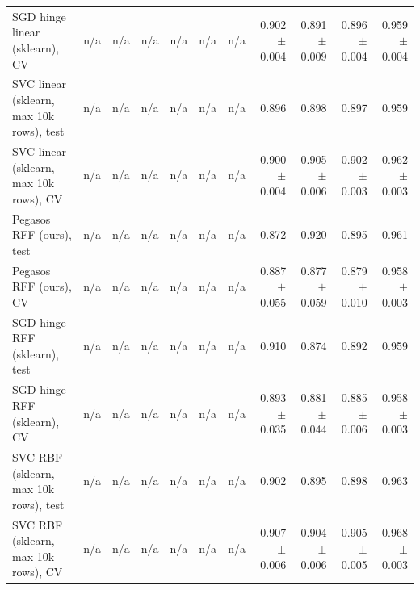 \begin{tabular}{lrrrrrrrrrr}
SGD hinge linear (sklearn), CV & n/a & n/a & n/a & n/a & n/a & n/a & 0.902 $\pm$ 0.004 & 0.891 $\pm$ 0.009 & 0.896 $\pm$ 0.004 & 0.959 $\pm$ 0.004 \\
SVC linear (sklearn, max 10k rows), test & n/a & n/a & n/a & n/a & n/a & n/a & 0.896 & 0.898 & 0.897 & 0.959 \\
SVC linear (sklearn, max 10k rows), CV & n/a & n/a & n/a & n/a & n/a & n/a & 0.900 $\pm$ 0.004 & 0.905 $\pm$ 0.006 & 0.902 $\pm$ 0.003 & 0.962 $\pm$ 0.003 \\
Pegasos RFF (ours), test & n/a & n/a & n/a & n/a & n/a & n/a & 0.872 & 0.920 & 0.895 & 0.961 \\
Pegasos RFF (ours), CV & n/a & n/a & n/a & n/a & n/a & n/a & 0.887 $\pm$ 0.055 & 0.877 $\pm$ 0.059 & 0.879 $\pm$ 0.010 & 0.958 $\pm$ 0.003 \\
SGD hinge RFF (sklearn), test & n/a & n/a & n/a & n/a & n/a & n/a & 0.910 & 0.874 & 0.892 & 0.959 \\
SGD hinge RFF (sklearn), CV & n/a & n/a & n/a & n/a & n/a & n/a & 0.893 $\pm$ 0.035 & 0.881 $\pm$ 0.044 & 0.885 $\pm$ 0.006 & 0.958 $\pm$ 0.003 \\
SVC RBF (sklearn, max 10k rows), test & n/a & n/a & n/a & n/a & n/a & n/a & 0.902 & 0.895 & 0.898 & 0.963 \\
SVC RBF (sklearn, max 10k rows), CV & n/a & n/a & n/a & n/a & n/a & n/a & 0.907 $\pm$ 0.006 & 0.904 $\pm$ 0.006 & 0.905 $\pm$ 0.005 & 0.968 $\pm$ 0.003 \\
\bottomrule
\end{tabular}
